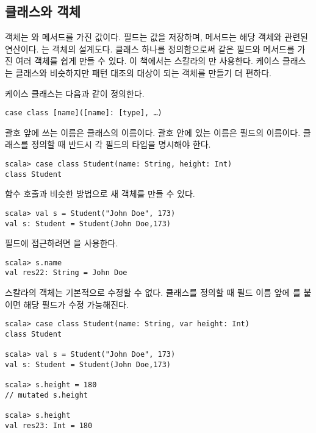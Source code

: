 \subsection{클래스와 객체}

객체는 와 메서드를 가진 값이다. 필드는 값을 저장하며, 메서드는 해당
객체와 관련된 연산이다. 는 객체의 설계도다. 클래스 하나를 정의함으로써
같은 필드와 메서드를 가진 여러 객체를 쉽게 만들 수 있다. 이 책에서는 스칼라의
만 사용한다. 케이스 클래스는 클래스와 비슷하지만
패턴 대조의 대상이 되는 객체를 만들기 더 편하다.

케이스 클래스는 다음과 같이 정의한다.

\begin{verbatim}
case class [name]([name]: [type], …)
\end{verbatim}

괄호 앞에 쓰는 이름은 클래스의 이름이다. 괄호 안에 있는 이름은 필드의 이름이다.
클래스를 정의할 때 반드시 각 필드의 타입을 명시해야 한다.

\begin{verbatim}
scala> case class Student(name: String, height: Int)
class Student
\end{verbatim}

함수 호출과 비슷한 방법으로 새 객체를 만들 수 있다.

\begin{verbatim}
scala> val s = Student("John Doe", 173)
val s: Student = Student(John Doe,173)
\end{verbatim}

필드에 접근하려면 을 사용한다.

\begin{verbatim}
scala> s.name
val res22: String = John Doe
\end{verbatim}

스칼라의 객체는 기본적으로 수정할 수 없다. 클래스를 정의할 때 필드 이름 앞에
를 붙이면 해당 필드가 수정 가능해진다.

\begin{verbatim}
scala> case class Student(name: String, var height: Int)
class Student

scala> val s = Student("John Doe", 173)
val s: Student = Student(John Doe,173)

scala> s.height = 180
// mutated s.height

scala> s.height
val res23: Int = 180
\end{verbatim}

